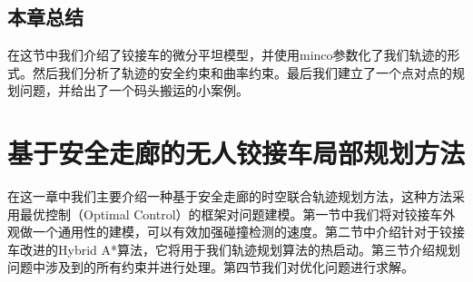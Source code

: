 \documentclass[master,academic]{ysuthesis} %
\begin{document}
	\section{本章总结}
	在这节中我们介绍了铰接车的微分平坦模型，并使用minco参数化了我们轨迹的形式。然后我们分析了轨迹的安全约束和曲率约束。最后我们建立了一个点对点的规划问题，并给出了一个码头搬运的小案例。
	
	
	\chapter{基于安全走廊的无人铰接车局部规划方法}
	在这一章中我们主要介绍一种基于安全走廊的时空联合轨迹规划方法，这种方法采用最优控制（Optimal Control）的框架对问题建模。第一节中我们将对铰接车外观做一个通用性的建模，可以有效加强碰撞检测的速度。第二节中介绍针对于铰接车改进的Hybrid A*算法，它将用于我们轨迹规划算法的热启动。第三节介绍规划问题中涉及到的所有约束并进行处理。第四节我们对优化问题进行求解。
\end{document}

